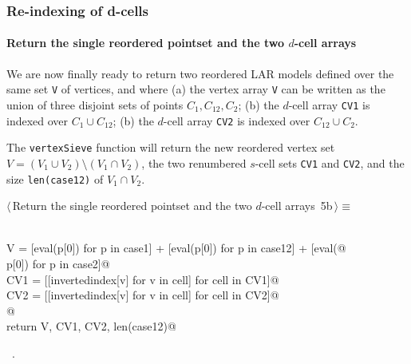 \documentclass[11pt,oneside]{article}	%
\begin{document}
\subsubsection{Re-indexing of d-cells}

\paragraph{Return the single reordered pointset and the two $d$-cell arrays}
We are now finally ready to return two reordered LAR models defined over the same set \texttt{V} of vertices, and where (a) the vertex array \texttt{V} can be written as the union of three disjoint sets of points $C_1,C_{12},C_2$; (b) the $d$-cell array \texttt{CV1} is indexed over $C_1\cup C_{12}$; (b) the $d$-cell array \texttt{CV2} is indexed over $C_{12}\cup C_{2}$. 

The \texttt{vertexSieve} function will return the new reordered vertex set $V = (V_1 \cup V_2) \setminus (V_1 \cap V_2)$, the two renumbered $s$-cell sets \texttt{CV1} and \texttt{CV2}, and the size \texttt{len(case12)} of $V_1 \cap V_2$.
\begin{flushleft} \small \label{scrap8}
\protect{}$\langle\,$Return the single reordered pointset and the two $d$-cell arrays\nobreak\ {\footnotesize 5b}$\,\rangle\equiv$
\vspace{-1ex}
\begin{list}{}{} \item
\mbox{}\verb@@\\
\mbox{}\verb@   V = [eval(p[0]) for p in case1] + [eval(p[0]) for p in case12] + [eval(@\\
\mbox{}\verb@            p[0]) for p in case2]@\\
\mbox{}\verb@   CV1 = [[invertedindex[v] for v in cell] for cell in CV1]@\\
\mbox{}\verb@   CV2 = [[invertedindex[v] for v in cell] for cell in CV2]@\\
\mbox{}\verb@   @\\
\mbox{}\verb@   return V, CV1, CV2, len(case12)@\\
\mbox{}\verb@@{\NWsep}
\end{list}
\vspace{-1ex}
\footnotesize\addtolength{\baselineskip}{-1ex}
\begin{list}{}{\setlength{\itemsep}{-\parsep}\setlength{\itemindent}{-\leftmargin}}
\item \NWtxtMacroRefIn\ .
\end{list}
\end{flushleft}
\end{document}
